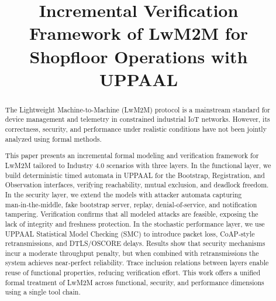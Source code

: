 \documentclass[a4paper,fleqn]{cas-sc}
\begin{document}
\let\WriteBookmarks\relax
\def\floatpagepagefraction{1}
\def\textpagefraction{.001}
\newtheorem{remark}{Remark}



\title [mode = title]{Incremental Verification Framework of LwM2M for Shopfloor Operations with UPPAAL}                      






    



\begin{abstract}
The Lightweight Machine-to-Machine (LwM2M) protocol is a mainstream standard for device management and telemetry in constrained industrial IoT networks. However, its correctness, security, and performance under realistic conditions have not been jointly analyzed using formal methods. 

This paper presents an incremental formal modeling and verification framework for LwM2M tailored to Industry 4.0 scenarios with three layers. 
In the functional layer, we build deterministic timed automata in UPPAAL for the Bootstrap, Registration, and Observation interfaces, verifying reachability, mutual exclusion, and deadlock freedom. In the security layer, we extend the models with attacker automata capturing man‑in‑the‑middle, fake bootstrap server, replay, denial‑of‑service, and notification tampering. Verification confirms that all modeled attacks are feasible, exposing the lack of integrity and freshness protection. In the stochastic performance layer, we use UPPAAL Statistical Model Checking (SMC) to introduce packet loss, CoAP‑style retransmissions, and DTLS/OSCORE delays. Results show that security mechanisms incur a moderate throughput penalty, but when combined with retransmissions the system achieves near‑perfect reliability. Trace inclusion relations between layers enable reuse of functional properties, reducing verification effort. This work offers a unified formal treatment of LwM2M across functional, security, and performance dimensions using a single tool chain.
\end{abstract}
\end{document}
